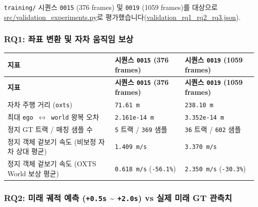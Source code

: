 \documentclass[10.5pt,a4paper]{article}
\begin{document}
\texttt{training/\allowbreak{}} 시퀀스 \texttt{0015} (376 frames) 및 \texttt{0019} (1059 frames)를 대상으로 \href{https://github.com/Heisnotanimposter/Totalcare\_autonomous\_driving\_Yolov5/blob/main/src/validation\_experiments.py}{src/validation\_experiments.py}로 평가했습니다(\href{https://github.com/Heisnotanimposter/Totalcare\_autonomous\_driving\_Yolov5/blob/main/results/world\_model/world\_outputs/validation\_rq1\_rq2\_rq3.json}{validation\_rq1\_rq2\_rq3.json}).


\subsubsection{RQ1: 좌표 변환 및 자차 움직임 보상}

\begin{footnotesize}
\setlength{\tabcolsep}{4pt}
\setlength{\LTleft}{0pt}\setlength{\LTright}{0pt}
\begin{longtable}{>{\raggedright\arraybackslash}p{} >{\raggedright\arraybackslash}p{} >{\raggedright\arraybackslash}p{}}
\toprule
\textbf{지표} & \textbf{시퀀스 \texttt{0015} (376 frames)} & \textbf{시퀀스 \texttt{0019} (1059 frames)} \\
\midrule
\endfirsthead
\toprule
\textbf{지표} & \textbf{시퀀스 \texttt{0015} (376 frames)} & \textbf{시퀀스 \texttt{0019} (1059 frames)} \\
\midrule
\endhead
\bottomrule
\endfoot
자차 주행 거리 (\texttt{oxts}) & \texttt{71.\allowbreak{}61 m} & \texttt{238.\allowbreak{}10 m} \\
최대 \texttt{ego $\leftrightarrow$ world} 왕복 오차 & \texttt{2.\allowbreak{}161e-\allowbreak{}14 m} & \texttt{3.\allowbreak{}352e-\allowbreak{}14 m} \\
정지 GT 트랙 / 매칭 샘플 수 & \texttt{5} 트랙 / \texttt{369} 샘플 & \texttt{36} 트랙 / \texttt{602} 샘플 \\
정지 객체 겉보기 속도 (비보정 자차 상대 평균) & \texttt{1.\allowbreak{}409 m/\allowbreak{}s} & \texttt{3.\allowbreak{}370 m/\allowbreak{}s} \\
정지 객체 겉보기 속도 (OXTS World 보상 평균) & \texttt{0.\allowbreak{}618 m/\allowbreak{}s} (\texttt{-\allowbreak{}56.\allowbreak{}1\%}) & \texttt{2.\allowbreak{}350 m/\allowbreak{}s} (\texttt{-\allowbreak{}30.\allowbreak{}3\%}) \\
\end{longtable}
\end{footnotesize}


\subsubsection{RQ2: 미래 궤적 예측 (\texttt{+0.\allowbreak{}5s} \textasciitilde{} \texttt{+2.\allowbreak{}0s}) vs 실제 미래 GT 관측치}
\end{document}
